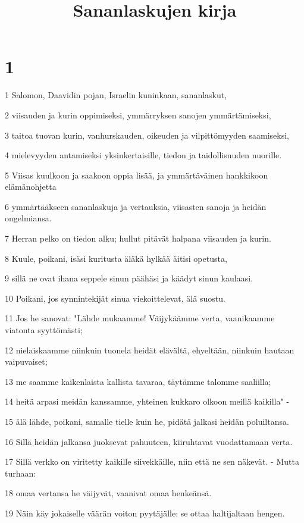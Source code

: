 

\title{Sananlaskujen kirja}


\chapter{1}

\par 1 Salomon, Daavidin pojan, Israelin kuninkaan, sananlaskut,
\par 2 viisauden ja kurin oppimiseksi, ymmärryksen sanojen ymmärtämiseksi,
\par 3 taitoa tuovan kurin, vanhurskauden, oikeuden ja vilpittömyyden saamiseksi,
\par 4 mielevyyden antamiseksi yksinkertaisille, tiedon ja taidollisuuden nuorille.
\par 5 Viisas kuulkoon ja saakoon oppia lisää, ja ymmärtäväinen hankkikoon elämänohjetta
\par 6 ymmärtääkseen sananlaskuja ja vertauksia, viisasten sanoja ja heidän ongelmiansa.
\par 7 Herran pelko on tiedon alku; hullut pitävät halpana viisauden ja kurin.
\par 8 Kuule, poikani, isäsi kuritusta äläkä hylkää äitisi opetusta,
\par 9 sillä ne ovat ihana seppele sinun päähäsi ja käädyt sinun kaulaasi.
\par 10 Poikani, jos synnintekijät sinua viekoittelevat, älä suostu.
\par 11 Jos he sanovat: "Lähde mukaamme! Väijykäämme verta, vaanikaamme viatonta syyttömästi;
\par 12 nielaiskaamme niinkuin tuonela heidät elävältä, ehyeltään, niinkuin hautaan vaipuvaiset;
\par 13 me saamme kaikenlaista kallista tavaraa, täytämme talomme saaliilla;
\par 14 heitä arpasi meidän kanssamme, yhteinen kukkaro olkoon meillä kaikilla" -
\par 15 älä lähde, poikani, samalle tielle kuin he, pidätä jalkasi heidän poluiltansa.
\par 16 Sillä heidän jalkansa juoksevat pahuuteen, kiiruhtavat vuodattamaan verta.
\par 17 Sillä verkko on viritetty kaikille siivekkäille, niin että ne sen näkevät. - Mutta turhaan:
\par 18 omaa vertansa he väijyvät, vaanivat omaa henkeänsä.
\par 19 Näin käy jokaiselle väärän voiton pyytäjälle: se ottaa haltijaltaan hengen.
